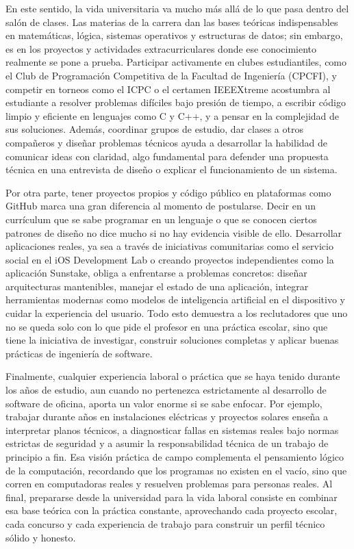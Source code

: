 \documentclass[12pt]{article}
\begin{document}
En este sentido, la vida universitaria va mucho más allá de lo que pasa dentro del salón de clases. Las materias de la carrera dan las bases teóricas indispensables en matemáticas, lógica, sistemas operativos y estructuras de datos; sin embargo, es en los proyectos y actividades extracurriculares donde ese conocimiento realmente se pone a prueba. Participar activamente en clubes estudiantiles, como el Club de Programación Competitiva de la Facultad de Ingeniería (CPCFI), y competir en torneos como el ICPC o el certamen IEEEXtreme acostumbra al estudiante a resolver problemas difíciles bajo presión de tiempo, a escribir código limpio y eficiente en lenguajes como C y C++, y a pensar en la complejidad de sus soluciones. Además, coordinar grupos de estudio, dar clases a otros compañeros y diseñar problemas técnicos ayuda a desarrollar la habilidad de comunicar ideas con claridad, algo fundamental para defender una propuesta técnica en una entrevista de diseño o explicar el funcionamiento de un sistema.

Por otra parte, tener proyectos propios y código público en plataformas como GitHub marca una gran diferencia al momento de postularse. Decir en un currículum que se sabe programar en un lenguaje o que se conocen ciertos patrones de diseño no dice mucho si no hay evidencia visible de ello. Desarrollar aplicaciones reales, ya sea a través de iniciativas comunitarias como el servicio social en el iOS Development Lab o creando proyectos independientes como la aplicación Sunstake, obliga a enfrentarse a problemas concretos: diseñar arquitecturas mantenibles, manejar el estado de una aplicación, integrar herramientas modernas como modelos de inteligencia artificial en el dispositivo y cuidar la experiencia del usuario. Todo esto demuestra a los reclutadores que uno no se queda solo con lo que pide el profesor en una práctica escolar, sino que tiene la iniciativa de investigar, construir soluciones completas y aplicar buenas prácticas de ingeniería de software.

Finalmente, cualquier experiencia laboral o práctica que se haya tenido durante los años de estudio, aun cuando no pertenezca estrictamente al desarrollo de software de oficina, aporta un valor enorme si se sabe enfocar. Por ejemplo, trabajar durante años en instalaciones eléctricas y proyectos solares enseña a interpretar planos técnicos, a diagnosticar fallas en sistemas reales bajo normas estrictas de seguridad y a asumir la responsabilidad técnica de un trabajo de principio a fin. Esa visión práctica de campo complementa el pensamiento lógico de la computación, recordando que los programas no existen en el vacío, sino que corren en computadoras reales y resuelven problemas para personas reales. Al final, prepararse desde la universidad para la vida laboral consiste en combinar esa base teórica con la práctica constante, aprovechando cada proyecto escolar, cada concurso y cada experiencia de trabajo para construir un perfil técnico sólido y honesto.

\nocite{*}
\printbibliography[heading=bibintoc, title={Referencias}]
\end{document}

